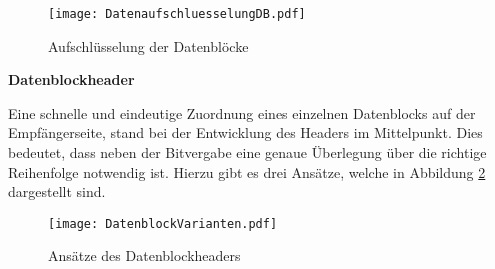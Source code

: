 \begin{figure}[H]
	\centering
	\texttt{[image: DatenaufschluesselungDB.pdf]}
	\caption{Aufschlüsselung der Datenblöcke}
  \label{fig:DatenaufschluesselungDB}
\end{figure}

\textbf{Datenblockheader}

Eine schnelle und eindeutige Zuordnung eines einzelnen Datenblocks auf der
Empfängerseite,  stand bei der Entwicklung des Headers im
Mittelpunkt.
Dies bedeutet, dass neben der Bitvergabe eine genaue Überlegung über die
richtige Reihenfolge notwendig ist. Hierzu gibt es drei Ansätze, welche in
Abbildung \ref{fig:DatenblockVarianten} dargestellt sind.

\begin{figure}[H]
	\centering
	\texttt{[image: DatenblockVarianten.pdf]}
	\caption{Ansätze des Datenblockheaders}
  \label{fig:DatenblockVarianten}
\end{figure}


